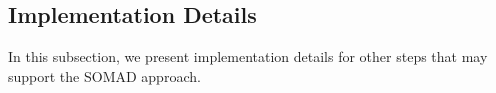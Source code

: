 \subsection{Implementation Details\label{details}}

\noindent In this subsection, we present implementation details for other steps that may support the SOMAD approach. 

\vspace{.15cm}

\vspace{.15cm}

%


\vspace{.15cm}

